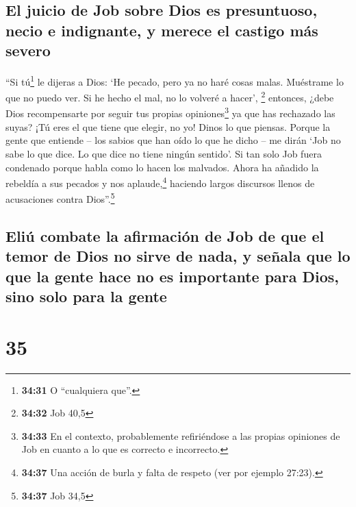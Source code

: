 \hypertarget{el-juicio-de-job-sobre-dios-es-presuntuoso-necio-e-indignante-y-merece-el-castigo-muxe1s-severo}{%
\subsection{El juicio de Job sobre Dios es presuntuoso, necio e
indignante, y merece el castigo más
severo}\label{el-juicio-de-job-sobre-dios-es-presuntuoso-necio-e-indignante-y-merece-el-castigo-muxe1s-severo}}

 ``Si tú\footnote{\textbf{34:31} O ``cualquiera que''.}
le dijeras a Dios: `He pecado, pero ya no haré cosas malas.
 Muéstrame lo que no puedo ver. Si he hecho el mal, no lo
volveré a hacer', \footnote{\textbf{34:32} Job 40,5} 
entonces, ¿debe Dios recompensarte por seguir tus propias
opiniones\footnote{\textbf{34:33} En el contexto, probablemente
  refiriéndose a las propias opiniones de Job en cuanto a lo que es
  correcto e incorrecto.} ya que has rechazado las suyas? ¡Tú eres el
que tiene que elegir, no yo! Dinos lo que piensas. 
Porque la gente que entiende -- los sabios que han oído lo que he dicho
-- me dirán  `Job no sabe lo que dice. Lo que dice no
tiene ningún sentido'.  Si tan solo Job fuera condenado
porque habla como lo hacen los malvados.  Ahora ha
añadido la rebeldía a sus pecados y nos aplaude,\footnote{\textbf{34:37}
  Una acción de burla y falta de respeto (ver por ejemplo 27:23).}
haciendo largos discursos llenos de acusaciones contra
Dios''.\footnote{\textbf{34:37} Job 34,5}

\hypertarget{eliuxfa-combate-la-afirmaciuxf3n-de-job-de-que-el-temor-de-dios-no-sirve-de-nada-y-seuxf1ala-que-lo-que-la-gente-hace-no-es-importante-para-dios-sino-solo-para-la-gente}{%
\subsection{Eliú combate la afirmación de Job de que el temor de Dios no
sirve de nada, y señala que lo que la gente hace no es importante para
Dios, sino solo para la
gente}\label{eliuxfa-combate-la-afirmaciuxf3n-de-job-de-que-el-temor-de-dios-no-sirve-de-nada-y-seuxf1ala-que-lo-que-la-gente-hace-no-es-importante-para-dios-sino-solo-para-la-gente}}

\hypertarget{section-34}{%
\section{35}\label{section-34}}

